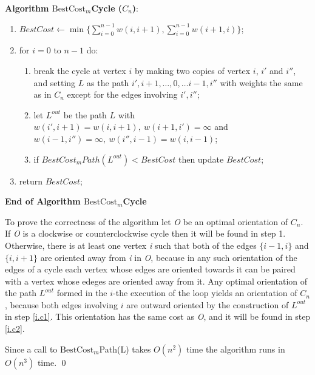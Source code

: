 \noindent \textbf{Algorithm $\mbox{BestCost}_m$Cycle ($C_n$)}:

\begin{enumerate}
	\item $BestCost \leftarrow \min\{\sum_{i=0}^{n-1}w(i,i+1), \sum_{i=0}^{n-1}w(i+1,i)\}$;
	\item \label{ac.i1} for $i= 0$ to $n-1$ do:
	\begin{enumerate}
		\item break the cycle at vertex $i$ by making two copies of vertex 
		$i$, $i'$ and $i''$, and setting $L$ as the path $i', i+1,\ldots ,0,\ldots i-1, i''$
		with weights the same as in $C_n$ except for the edges involving $i', i''$;  
		\item \label{i.c1}let $L^{out}$ be the path $L$
		with $w(i',i+1)=w(i,i+1),\ w(i+1,i')=\infty$ and 
		$w(i-1,i'')=\infty,\  w(i'',i-1)=w(i,i-1)$;
		\item \label{i.c2}
		if $BestCost_m Path(L^{out})< BestCost$ then update $BestCost$;
	\end{enumerate}		
	\item return $BestCost$; 
\end{enumerate}	
\noindent \textbf{End of Algorithm $\mbox{BestCost}_m$Cycle}
\bigskip

To prove the correctness of the algorithm let \textit{O} be an optimal orientation 
of $C_n$.
If \textit{O} is a clockwise or counterclockwise cycle then it will be found in step 1.
Otherwise, there is at least one vertex \textit{i} such that both of the edges $\{i-1,i\}$ and $\{i,i+1\}$
are oriented away from \textit{i} in \textit{O}, because in any such orientation of the edges
of a cycle each vertex whose edges are oriented towards it can be paired with a 
vertex whose edeges are oriented away from it.
Any optimal orientation of the path $L^{out}$ formed in 
the $i$-the execution of the loop yields an
orientation of $C_n$, because both edges involving $i$ are outward oriented
by the construction of $L^{out}$ in step \ref{i.c1}. This orientation has the same cost 
as \textit{O}, and it will be found in step \ref{i.c2}.

Since a call to $\mbox{BestCost}_m$Path(L) takes $O(n^2)$ time the algorithm runs in $O(n^3)$ time.
\qed
